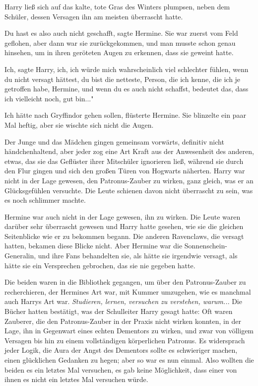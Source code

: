 Harry ließ sich auf das kalte, tote Gras des Winters plumpsen, neben dem
Schüler, dessen Versagen ihn am meisten überrascht hatte.

\glqq{}Du hast es also auch nicht geschafft\grqq{}, sagte Hermine. Sie war zuerst
vom Feld geflohen, aber dann war sie zurückgekommen, und man musste schon genau
hinsehen, um in ihren geröteten Augen zu erkennen, dass sie geweint hatte.

\glqq{}Ich\grqq{}, sagte Harry, \glqq{}ich, ich würde mich wahrscheinlich viel
schlechter fühlen, wenn du nicht versagt hättest, du bist die netteste, Person,
die ich kenne, die ich je getroffen habe, Hermine, und wenn du es auch nicht
schaffst, bedeutet das, dass ich vielleicht noch, gut bin..."

\glqq{}Ich hätte nach Gryffindor gehen sollen\grqq{}, flüsterte Hermine. Sie
blinzelte ein paar Mal heftig, aber sie wischte sich nicht die Augen.

Der Junge und das Mädchen gingen gemeinsam vorwärts, definitiv nicht
händchenhaltend, aber jeder zog eine Art Kraft aus der Anwesenheit des anderen,
etwas, das sie das Geflüster ihrer Mitschüler ignorieren ließ, während sie durch
den Flur gingen und sich den großen Türen von Hogwarts näherten. Harry war nicht
in der Lage gewesen, den Patronus-Zauber zu wirken, ganz gleich, was er an
Glücksgefühlen versuchte. Die Leute schienen davon nicht überrascht zu sein, was
es noch schlimmer machte.

Hermine war auch nicht in der Lage gewesen, ihn zu wirken. Die Leute waren
darüber sehr überrascht gewesen und Harry hatte gesehen, wie sie die gleichen
Seitenblicke wie er zu bekommen begann. Die anderen Ravenclaws, die versagt
hatten, bekamen diese Blicke nicht. Aber Hermine war die Sonnenschein-Generalin,
und ihre Fans behandelten sie, als hätte sie irgendwie versagt, als hätte sie
ein Versprechen gebrochen, das sie nie gegeben hatte.

Die beiden waren in die Bibliothek gegangen, um über den Patronus-Zauber zu
recherchieren, der Hermines Art war, mit Kummer umzugehen, wie es manchmal auch
Harrys Art war. \emph{Studieren, lernen, versuchen zu verstehen, warum..}. Die
Bücher hatten bestätigt, was der Schulleiter Harry gesagt hatte: Oft waren
Zauberer, die den Patronus-Zauber in der Praxis nicht wirken konnten, in der
Lage, ihn in Gegenwart eines echten Dementors zu wirken, und zwar von völligem
Versagen bis hin zu einem vollständigen körperlichen Patronus. Es widersprach
jeder Logik, die Aura der Angst des Dementors sollte es schwieriger machen,
einen glücklichen Gedanken zu hegen; aber so war es nun einmal. Also wollten die
beiden es ein letztes Mal versuchen, es gab keine Möglichkeit, dass einer von
ihnen es nicht ein letztes Mal versuchen würde.

